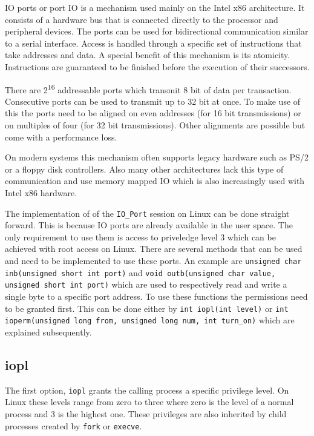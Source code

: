 \documentclass[
a4paper,
12pt,
notitlepage,
parskip=half,
DIV=11,
]{scrbook}
\begin{document}
		IO ports or port IO is a mechanism used mainly on the Intel x86 architecture.
		It consists of a hardware bus that is connected directly to the processor and peripheral devices.
		The ports can be used for bidirectional communication similar to a serial interface.
		Access is handled through a specific set of instructions that take addresses and data.
		A special benefit of this mechanism is its atomicity.
		Instructions are guaranteed to be finished before the execution of their successors.
		
		There are 2\textsuperscript{16} addressable ports which transmit 8 bit of data per transaction.
		Consecutive ports can be used to transmit up to 32 bit at once.
		To make use of this the ports need to be aligned on even addresses (for 16 bit transmissions) or on multiples of four (for 32 bit transmissions).
		Other alignments are possible but come with a performance loss.
		
		On modern systems this mechanism often supports legacy hardware such as PS/2 or a floppy disk controllers.
		Also many other architectures lack this type of communication and use memory mapped IO which is also increasingly used with Intel x86 hardware.
		\citep{ioports} \citep{intelmanual}
		
		The implementation of of the \texttt{IO\_Port} session on Linux can be done straight forward.
		This is because IO ports are already available in the user space.
		The only requirement to use them is access to priveledge level 3 which can be achieved with root access on Linux.
		There are several methods that can be used and need to be implemented to use these ports.
		An example are \texttt{unsigned char inb(unsigned short int port)} and \texttt{void outb(unsigned char value, unsigned short int port)} which are used to respectively read and write a single byte to a specific port address.
		To use these functions the permissions need to be granted first.
		This can be done either by \texttt{int iopl(int level)} or \texttt{int ioperm(unsigned long from, unsigned long num, int turn\_on)} which are explained subsequently. \citep{outb} \citep{ioperm} \citep{iopl}
				
		\subsection{iopl}
		
		The first option, \texttt{iopl} grants the calling process a specific privilege level.
		On Linux these levels range from zero to three where zero is the level of a normal process and 3 is the highest one.
		These privileges are also inherited by child processes created by \texttt{fork} or \texttt{execve}. \citep{iopl}
		
\end{document}
